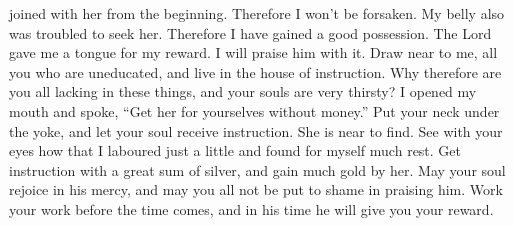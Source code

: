 joined with her from the beginning. Therefore I won't be forsaken.
 My belly also was troubled to seek her. Therefore I have
gained a good possession.  The Lord gave me a tongue for my
reward. I will praise him with it.  Draw near to me, all
you who are uneducated, and live in the house of instruction.
 Why therefore are you all lacking in these things, and
your souls are very thirsty?  I opened my mouth and spoke,
``Get her for yourselves without money.''  Put your neck
under the yoke, and let your soul receive instruction. She is near to
find.  See with your eyes how that I laboured just a little
and found for myself much rest.  Get instruction with a
great sum of silver, and gain much gold by her.  May your
soul rejoice in his mercy, and may you all not be put to shame in
praising him.  Work your work before the time comes, and in
his time he will give you your reward.

